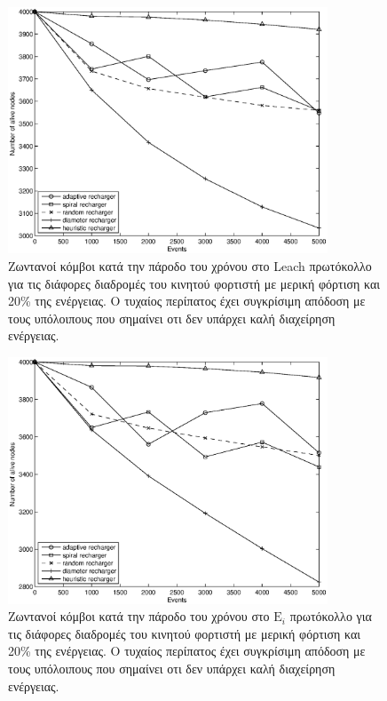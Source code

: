 \begin{figure}[H]
  \centering
  \includegraphics[width=0.85\textwidth]{experiments/4000nodes/4.ourVSnaive/alive_nodes_leach_rc_per_our-spiral-random-diameter-heuristic.eps}
  \caption{Ζωντανοί κόμβοι κατά την πάροδο του χρόνου στο Leach πρωτόκολλο για τις διάφορες διαδρομές του κινητού φορτιστή με μερική φόρτιση και 20\% της
ενέργειας. Ο τυχαίος περίπατος έχει συγκρίσιμη απόδοση με τους υπόλοιπους που σημαίνει οτι δεν υπάρχει καλή διαχείρηση ενέργειας.}
  \label{fig:5_4exp_1_2}
\end{figure}

\begin{figure}[H]
  \centering
  \includegraphics[width=0.85\textwidth]{experiments/4000nodes/4.ourVSnaive/alive_nodes_ei_rc_per_our-spiral-random-diameter-heuristic.eps}
  \caption{Ζωντανοί κόμβοι κατά την πάροδο του χρόνου στο $\text{E}_{i}$ πρωτόκολλο για τις διάφορες διαδρομές του κινητού φορτιστή με μερική φόρτιση και 20\% της
ενέργειας. Ο τυχαίος περίπατος έχει συγκρίσιμη απόδοση με τους υπόλοιπους που σημαίνει οτι δεν υπάρχει καλή διαχείρηση ενέργειας.}
  \label{fig:5_4exp_1_3}
\end{figure}



